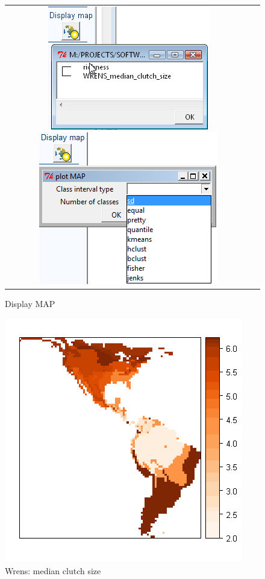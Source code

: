 \documentclass[ a4paper ]{article}
\begin{document}
	
\begin{figure}
  \begin{center}
    \begin{tabular}{cc}
      \includegraphics[width=0.5\linewidth]{fig12}
      \includegraphics[width=0.5\linewidth]{fig13}
    \end{tabular}
    \caption{\label{fig:fig12} Display MAP}
  \end{center}
\end{figure}
	
\begin{figure}[htbp]
  \begin{center}
	\includegraphics[width=0.5\linewidth]{map2a}
    \caption{\label{fig:map2a} Wrens: median clutch size}
  \end{center}
\end{figure}	
	
\end{document}
